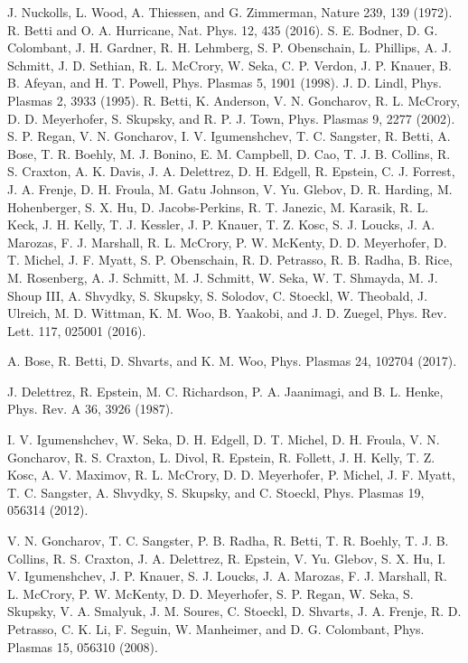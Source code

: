 \documentclass[aip,reprint]{revtex4-1}
\begin{document}
\begin{thebibliography}{5}
%
J. Nuckolls, L. Wood, A. Thiessen, and G. Zimmerman, Nature 239, 139 (1972).
%
R. Betti and O. A. Hurricane, Nat. Phys. 12, 435 (2016).
%
S. E. Bodner, D. G. Colombant, J. H. Gardner, R. H. Lehmberg, S. P. Obenschain, L. Phillips, A. J. Schmitt, J. D. Sethian, R. L. McCrory, W. Seka, C. P. Verdon, J. P. Knauer, B. B. Afeyan, and H. T. Powell, Phys. Plasmas 5, 1901 (1998).
%
J. D. Lindl, Phys. Plasmas 2, 3933 (1995).
%
R. Betti, K. Anderson, V. N. Goncharov, R. L. McCrory, D. D. Meyerhofer, S. Skupsky, and R. P. J. Town, Phys. Plasmas 9, 2277 (2002).
%
S. P. Regan, V. N. Goncharov, I. V. Igumenshchev, T. C. Sangster, R. Betti, A. Bose, T. R. Boehly, M. J. Bonino, E. M. Campbell, D. Cao, T. J. B. Collins, R. S. Craxton, A. K. Davis, J. A. Delettrez, D. H. Edgell, R. Epstein, C. J. Forrest, J. A. Frenje, D. H. Froula, M. Gatu Johnson, V. Yu. Glebov, D. R. Harding, M. Hohenberger, S. X. Hu, D. Jacobs-Perkins, R. T. Janezic, M. Karasik, R. L. Keck, J. H. Kelly, T. J. Kessler, J. P. Knauer, T. Z. Kosc, S. J. Loucks, J. A. Marozas, F. J. Marshall, R. L. McCrory, P. W. McKenty, D. D. Meyerhofer, D. T. Michel, J. F. Myatt, S. P. Obenschain, R. D. Petrasso, R. B. Radha, B. Rice, M. Rosenberg, A. J. Schmitt, M. J. Schmitt, W. Seka, W. T. Shmayda, M. J. Shoup III, A. Shvydky, S. Skupsky, S. Solodov, C. Stoeckl, W. Theobald, J. Ulreich, M. D. Wittman, K. M. Woo, B. Yaakobi, and J. D. Zuegel, Phys. Rev. Lett. 117, 025001 (2016).

A. Bose, R. Betti, D. Shvarts, and K. M. Woo, Phys. Plasmas 24, 102704 (2017).

J. Delettrez, R. Epstein, M. C. Richardson, P. A. Jaanimagi, and B. L. Henke, Phys. Rev. A 36, 3926 (1987).

I. V. Igumenshchev, W. Seka, D. H. Edgell, D. T. Michel, D. H. Froula, V. N. Goncharov, R. S. Craxton, L. Divol, R. Epstein, R. Follett, J. H. Kelly, T. Z. Kosc, A. V. Maximov, R. L. McCrory, D. D. Meyerhofer, P. Michel, J. F. Myatt, T. C. Sangster, A. Shvydky, S. Skupsky, and C. Stoeckl, Phys. Plasmas 19, 056314 (2012).

V. N. Goncharov, T. C. Sangster, P. B. Radha, R. Betti, T. R. Boehly, T. J. B. Collins, R. S. Craxton, J. A. Delettrez, R. Epstein, V. Yu. Glebov, S. X. Hu, I. V. Igumenshchev, J. P. Knauer, S. J. Loucks, J. A. Marozas, F. J. Marshall, R. L. McCrory, P. W. McKenty, D. D. Meyerhofer, S. P. Regan, W. Seka, S. Skupsky, V. A. Smalyuk, J. M. Soures, C. Stoeckl, D. Shvarts, J. A. Frenje, R. D. Petrasso, C. K. Li, F. Seguin, W. Manheimer, and D. G. Colombant, Phys. Plasmas 15, 056310 (2008).


\end{thebibliography}
\end{document}
